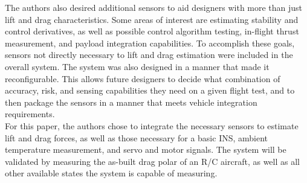 The authors also desired additional sensors to aid designers with more than just lift and drag characteristics. Some areas of interest are estimating stability and control derivatives, as well as possible control algorithm testing, in-flight thrust measurement, and payload integration capabilities. To accomplish these goals, sensors not directly necessary to lift and drag estimation were included in the overall system. The system was also designed in a manner that made it reconfigurable. This allows future designers to decide what combination of accuracy, risk, and sensing capabilities they need on a given flight test, and to then package the sensors in a manner that meets vehicle integration requirements.\\

For this paper, the authors chose to integrate the necessary sensors to estimate lift and drag forces, as well as those necessary for a basic INS, ambient temperature measurement, and servo and motor signals. The system will be validated by measuring the as-built drag polar of an R/C aircraft, as well as all other available states the system is capable of measuring.